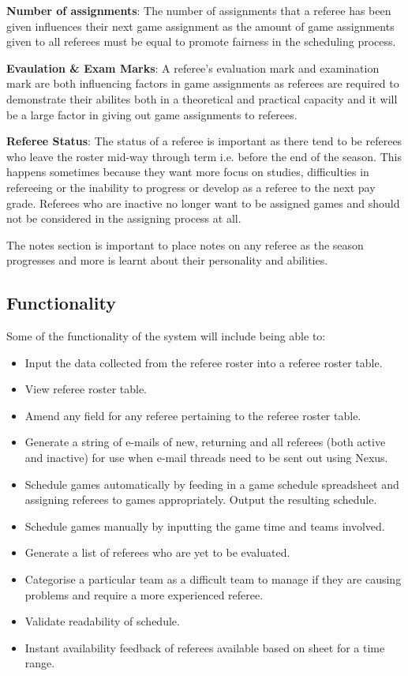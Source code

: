 \documentclass{article}
\begin{document}
{\bf Number of assignments}: The number of assignments that a referee has been given influences their next game assignment as the amount of game assignments given to all referees must be equal to promote fairness in the scheduling process.

{\bf Evaulation \& Exam Marks}: A referee's evaluation mark and examination mark are both influencing factors in game assignments as referees are required to demonstrate their abilites both in a theoretical and practical capacity and it will be a large factor in giving out game assignments to referees.

{\bf Referee Status}: The status of a referee is important as there tend to be referees who leave the roster mid-way through term i.e. before the end of the season. This happens sometimes because they want more focus on studies, difficulties in refereeing or the inability to progress or develop as a referee to the next pay grade. Referees who are inactive no longer want to be assigned games and should not be considered in the assigning process at all.

The notes section is important to place notes on any referee as the season progresses and more is learnt about their personality and abilities.

\subsection{Functionality}
Some of the functionality of the system will include being able to:
\begin{itemize}
\item Input the data collected from the referee roster into a referee roster table.
\item View referee roster table.
\item Amend any field for any referee pertaining to the referee roster table.
\item Generate a string of e-mails of new, returning and all referees (both active and inactive) for use when e-mail threads need to be sent out using Nexus.
\item Schedule games automatically by feeding in a game schedule spreadsheet and assigning referees to games appropriately. Output the resulting schedule.
\item Schedule games manually by inputting the game time and teams involved.
\item Generate a list of referees who are yet to be evaluated.
\item Categorise a particular team as a difficult team to manage if they are causing problems and require a more experienced referee.
\item Validate readability of schedule.
\item Instant availability feedback of referees available based on sheet for a time range.
\end{itemize}
\end{document}

